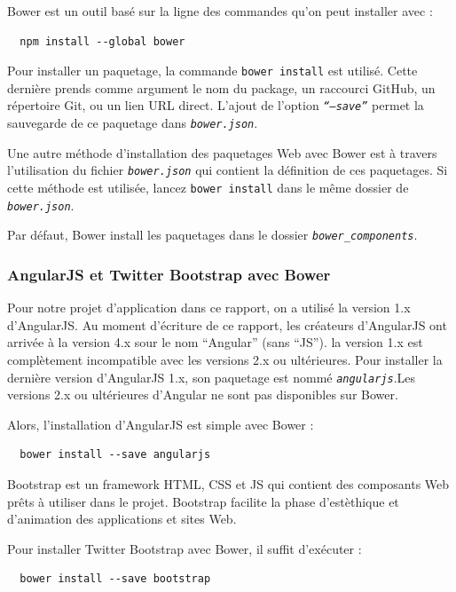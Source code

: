 \documentclass[a4paper,11pt,oneside]{report}
\begin{document}
\begin{appendices}
Bower est un outil basé sur la ligne des commandes qu'on peut installer avec :
  \begin{verbatim}
  npm install --global bower
  \end{verbatim}

Pour installer un paquetage, la commande \texttt{bower install} est utilisé. Cette dernière prends comme argument le nom du package, un raccourci GitHub, un répertoire Git, ou un lien URL direct. L'ajout de l'option \texttt{\emph{``---save''}} permet la sauvegarde de ce paquetage dans \texttt{\emph{bower.json}}.
\newline

Une autre méthode d'installation des paquetages Web avec Bower est à travers l'utilisation du fichier \texttt{\emph{bower.json}} qui contient la définition de ces paquetages. Si cette méthode est utilisée, lancez \texttt{bower install} dans le même dossier de \texttt{\emph{bower.json}}. 
\newline

Par défaut, Bower install les paquetages dans le dossier \texttt{\emph{bower\_components}}.

\subsubsection{AngularJS et Twitter Bootstrap avec Bower}
Pour notre projet d'application dans ce rapport, on a utilisé la version 1.x d'AngularJS. Au moment d'écriture de ce rapport, les créateurs d'AngularJS ont arrivée à la version 4.x sour le nom ``Angular'' (sans ``JS''). la version 1.x est complètement incompatible avec les versions 2.x ou ultérieures. Pour installer la dernière version d'AngularJS 1.x, son paquetage est nommé \texttt{\emph{angularjs}}.Les versions 2.x ou ultérieures d'Angular ne sont pas disponibles sur Bower.
\newline

Alors, l'installation d'AngularJS est simple avec Bower :
  \begin{verbatim}
  bower install --save angularjs
  \end{verbatim}

Bootstrap est un framework HTML, CSS et JS qui contient des composants Web prêts à utiliser dans le projet. Bootstrap facilite la phase d'estèthique et d'animation des applications et sites Web.
\newline

Pour installer Twitter Bootstrap avec Bower, il suffit d'exécuter :
  \begin{verbatim}
  bower install --save bootstrap
  \end{verbatim}

\end{appendices}





\newpage
\end{document}
